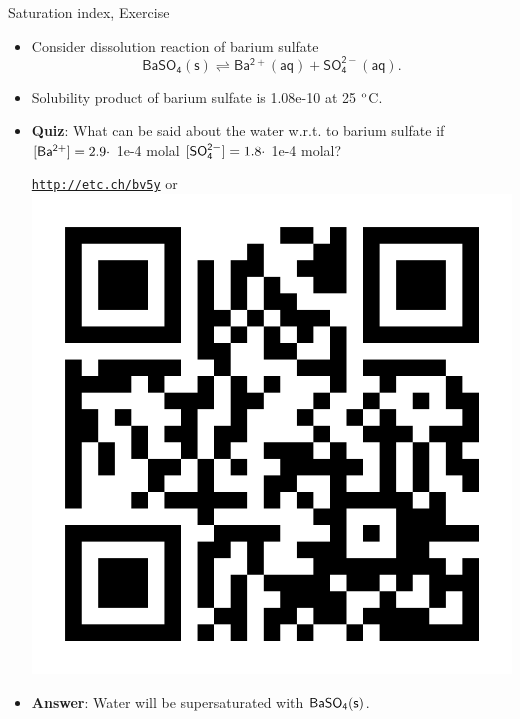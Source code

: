 \begin{frame}{Saturation index, Exercise}
	
%	

	\begin{itemize}
		\item Consider dissolution reaction of barium sulfate 
		\[
		\mathsf{BaSO_4(s) \rightleftharpoons Ba^{2+}(aq) + SO_4^{2-}(aq).}
		\]
		\item Solubility product of barium sulfate is 1.08e-10 at 25 ${\rm ^\circ}$C.
		\item  \alert{\bf Quiz}: What can be said about the water w.r.t. to barium sulfate if \\
		${\sf [Ba^{2+}}]=2.9 \cdot$ 1e-4 molal
		${\sf [SO_4^{2-}]}=1.8 \cdot$ 1e-4 molal?
		\begin{center}
			\href{http://etc.ch/bv5y}{\textcolor{indigo(dye)}{\tt http://etc.ch/bv5y}} 
			\quad
			or 
			\quad
			\includegraphics[height=0.2\columnwidth]{figures/chemical-equilibrium/poll.png}
		\end{center}
		\hiddenpause
		\item {\bf Answer}: Water will be supersaturated with ${\sf BaSO_4(s)}$.
	\end{itemize}

\end{frame}
%
%
